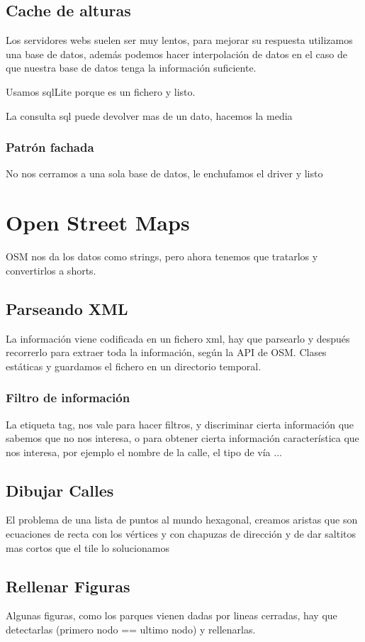 \subsection*{Cache de alturas}
Los servidores webs suelen ser muy lentos, para mejorar su respuesta utilizamos
una base de datos, además podemos hacer interpolación de datos en el caso de
que nuestra base de datos tenga la información suficiente.

Usamos sqlLite porque es un fichero y listo.

La consulta sql puede devolver mas de un dato, hacemos la media
\subsubsection*{Patrón fachada}
No nos cerramos a una sola base de datos, le enchufamos el driver y listo
\section*{Open Street Maps}
OSM nos da los datos como strings, pero ahora tenemos que tratarlos y
convertirlos a shorts.
\subsection*{Parseando XML}
La información viene codificada en un fichero xml, hay que parsearlo y después
recorrerlo para extraer toda la información, según la API de OSM. Clases
estáticas y guardamos el fichero en un directorio temporal.
\subsubsection*{Filtro de información}
La etiqueta tag, nos vale para hacer filtros, y discriminar cierta información
que sabemos que no nos interesa, o para obtener cierta información
característica que nos interesa, por ejemplo el nombre de la calle, el tipo de
vía ...
\subsection*{Dibujar Calles}
El problema de una lista de puntos al mundo hexagonal, creamos aristas que son
ecuaciones de recta con los vértices y con chapuzas de dirección y de dar
saltitos mas cortos que el tile lo solucionamos
\subsection*{Rellenar Figuras}
Algunas figuras, como los parques vienen dadas por lineas cerradas, hay que
detectarlas (primero nodo == ultimo nodo) y rellenarlas.

